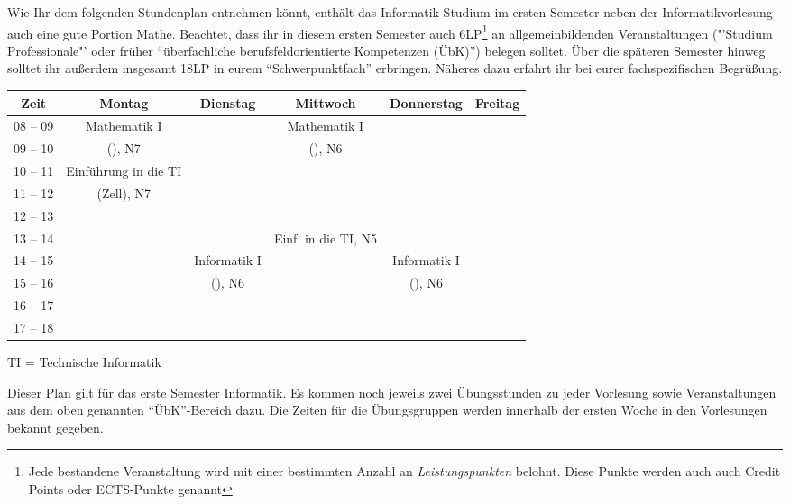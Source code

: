 Wie Ihr dem folgenden Stundenplan entnehmen könnt, enthält das Informatik-Studium im ersten
Semester neben der Informatikvorlesung auch eine gute Portion Mathe. Beachtet, dass ihr
in diesem ersten Semester auch 6LP\footnote{Jede bestandene Veranstaltung wird mit einer bestimmten Anzahl an \emph{Leistungspunkten} belohnt. Diese Punkte werden auch auch Credit Points oder ECTS-Punkte genannt} an allgemeinbildenden Veranstaltungen ("'Studium Professionale"' oder früher "`überfachliche berufsfeldorientierte Kompetenzen (ÜbK)"') belegen solltet.
Über die späteren Semester hinweg solltet ihr außerdem insgesamt 18LP in eurem "`Schwerpunktfach"' erbringen. Näheres dazu erfahrt ihr bei eurer fachspezifischen Begrüßung.

\begin{center}
	\begin{tabular}{|c|c|c|c|c|c|} \hline
		Zeit      & 			Montag 		& Dienstag			& Mittwoch 			& Donnerstag 			& Freitag	 \\
		\hline\hline
		08 -- 09  & 		Mathematik I 	&  					& Mathematik I 		&  						&			\\
		\cline{1-1}\cline{3-3}\cline{5-6}
		09 -- 10  & 		(\Matheprof), N7& 					& (\Matheprof), N6  &  						&			\\
		\hline
		10 -- 11  &	Einführung in die TI	&					&					&						&			\\
		\cline{1-1}\cline{3-6}
		11 -- 12 & 	(Zell), N7				&  					&					&			 			& 			\\
		\hline
		12 -- 13 & 							& 				 	& 				    & 						& 			 \\
		\hline
		13 -- 14 & 							& 					& Einf. in die TI, N5	& 						& 			 \\
		\hline
		14 -- 15 & 							& Informatik I 		& 					& Informatik I 			& 				\\
		\cline{1-2}\cline{4-4}\cline{6-6}
		15 -- 16 &							 & (\Infoprof), N6 	& 					& (\Infoprof), N6 		& 				\\
		\hline
		16 -- 17 & & & & &\\
		\hline
		17 -- 18 & & & & & \\
		\hline
	\end{tabular}
	
\scriptsize TI = Technische Informatik

\end{center}

Dieser Plan gilt für das erste Semester Informatik. Es kommen noch jeweils zwei Übungsstunden zu jeder Vorlesung 
sowie Veranstaltungen aus dem oben genannten "`\"UbK"'-Bereich dazu.
Die Zeiten für die Übungsgruppen werden innerhalb der ersten Woche in den Vorlesungen bekannt gegeben.
